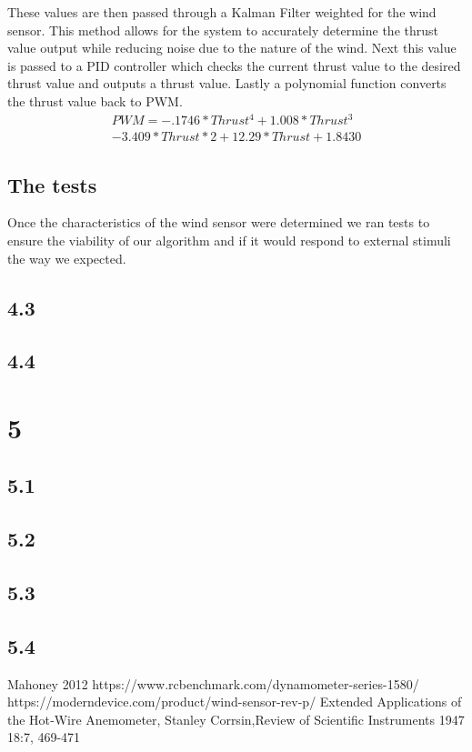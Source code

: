 \documentclass[twocolumn]{article}
\begin{document}
	These values are then passed through a Kalman Filter weighted for the wind sensor. This method allows for the system to accurately determine the thrust value output while reducing noise due to the nature of the wind. Next this value is passed to a PID controller which checks the current thrust value to the desired thrust value and outputs a thrust value. Lastly a polynomial function converts the thrust value back to PWM.
	\begin{eqnarray}
	PWM = -.1746*Thrust^4 + 1.008*Thrust^3\\ 
	- 3.409*Thrust*2 + 12.29*Thrust + 1.8430 \nonumber
	\label{pwm_poly}
	\end{eqnarray}
	\subsection{The tests}
	Once the characteristics of the wind sensor were determined we ran tests to ensure the viability of our algorithm and if it would respond to external stimuli the way we expected.
	\subsection{4.3}
	\subsection{4.4}
	
	\section{5}

	\subsection{5.1}
	\subsection{5.2}
	\subsection{5.3}
	\subsection{5.4}

	
	

	\begin{thebibliography}{99}
		 Mahoney 2012
		 https://www.rcbenchmark.com/dynamometer-series-1580/
		 https://moderndevice.com/product/wind-sensor-rev-p/
		 Extended Applications of the Hot‐Wire Anemometer, Stanley Corrsin,Review of Scientific Instruments 1947 18:7, 469-471 
		
	\end{thebibliography}
\end{document}
